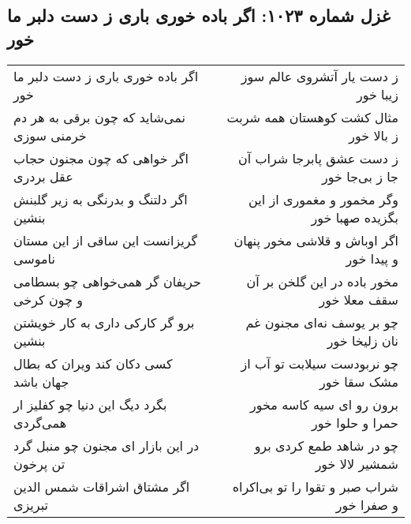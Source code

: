 \begin{center}
\section*{غزل شماره ۱۰۲۳: اگر باده خوری باری ز دست دلبر ما خور}
\label{sec:1023}
\begin{longtable}{l p{0.5cm} r}
اگر باده خوری باری ز دست دلبر ما خور
&&
ز دست یار آتشروی عالم سوز زیبا خور
\\
نمی‌شاید که چون برقی به هر دم خرمنی سوزی
&&
مثال کشت کوهستان همه شربت ز بالا خور
\\
اگر خواهی که چون مجنون حجاب عقل بردری
&&
ز دست عشق پابرجا شراب آن جا ز بی‌جا خور
\\
اگر دلتنگ و بدرنگی به زیر گلبنش بنشین
&&
وگر مخمور و مغموری از این بگزیده صهبا خور
\\
گریزانست این ساقی از این مستان ناموسی
&&
اگر اوباش و قلاشی مخور پنهان و پیدا خور
\\
حریفان گر همی‌خواهی چو بسطامی و چون کرخی
&&
مخور باده در این گلخن بر آن سقف معلا خور
\\
برو گر کارکی داری به کار خویشتن بنشین
&&
چو بر یوسف نه‌ای مجنون غم نان زلیخا خور
\\
کسی دکان کند ویران که بطال جهان باشد
&&
چو نربودست سیلابت تو آب از مشک سقا خور
\\
بگرد دیگ این دنیا چو کفلیز ار همی‌گردی
&&
برون رو ای سیه کاسه مخور حمرا و حلوا خور
\\
در این بازار ای مجنون چو منبل گرد تن پرخون
&&
چو در شاهد طمع کردی برو شمشیر لالا خور
\\
اگر مشتاق اشراقات شمس الدین تبریزی
&&
شراب صبر و تقوا را تو بی‌اکراه و صفرا خور
\\
\end{longtable}
\end{center}
